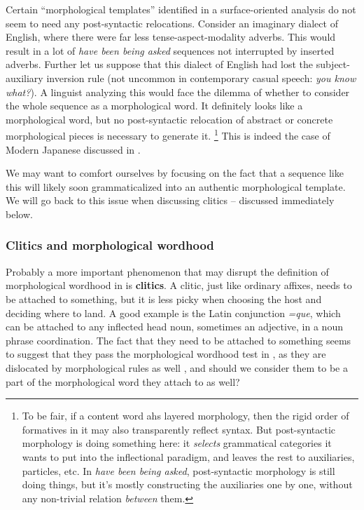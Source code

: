 \documentclass[a4paper, oneside, scheme=plain, 12pt]{article}
\newcommand*{\concept}[1]{\textbf{#1}}
\newcommand{\form}[1]{\emph{#1}}
\begin{document}
Certain ``morphological templates'' identified in a surface-oriented analysis
do not seem to need any post-syntactic relocations.
Consider an imaginary dialect of English,
where there were far less tense-aspect-modality adverbs.
This would result in a lot of \form{have been being asked} sequences
not interrupted by inserted adverbs.
Further let us suppose that this dialect of English had lost the subject-auxiliary inversion rule
(not uncommon in contemporary casual speech: \form{you know what?}).
A linguist analyzing this would face the dilemma of whether to
consider the whole sequence as a morphological word.
It definitely looks like a morphological word,
but no post-syntactic relocation of abstract or concrete morphological pieces is necessary to generate it.%
\footnote{
    To be fair, if a content word ahs layered morphology,
    then the rigid order of formatives in it may also transparently reflect syntax.
    But post-syntactic morphology is doing something here:
    it \emph{selects} grammatical categories it wants to put into the inflectional paradigm,
    and leaves the rest to auxiliaries, particles, etc.
    In \form{have been being asked}, post-syntactic morphology is still doing things,
    but it's mostly constructing the auxiliaries one by one,
    without any non-trivial relation \emph{between} them.
}
This is indeed the case of Modern Japanese discussed in .

We may want to comfort ourselves by focusing on the fact that a sequence like this will likely soon grammaticalized into an authentic morphological template.
We will go back to this issue when discussing clitics -- discussed immediately below.

\subsubsection{Clitics and morphological wordhood}\label{sec:morphological-wordhood-clitics}

Probably a more important phenomenon that may disrupt the definition of morphological wordhood in  is \concept{clitics}.
A clitic, just like ordinary affixes, needs to be attached to something,
but it is less picky when choosing the host and deciding where to land.
A good example is the Latin conjunction \form{=que},
which can be attached to any inflected head noun,
sometimes an adjective, in a noun phrase coordination.
The fact that they need to be attached to something
seems to suggest that they pass the morphological wordhood test in ,
as they are dislocated by morphological rules as well \citep{harley1999distributed},
and should we consider them to be a part of the morphological word they attach to as well?
\end{document}
